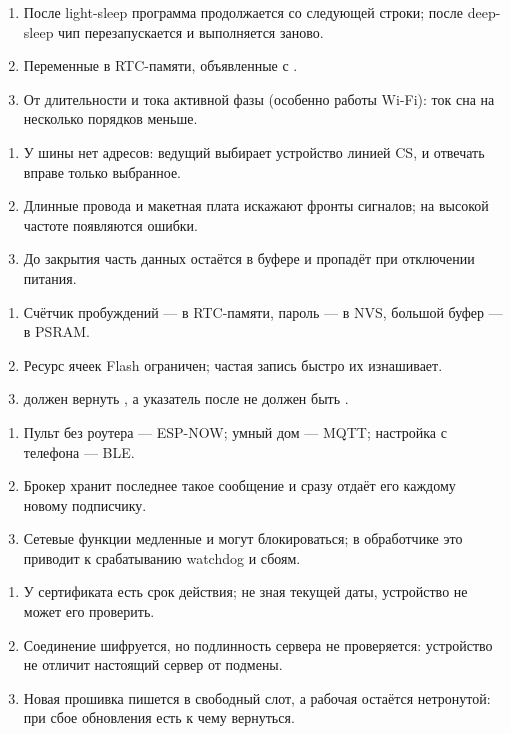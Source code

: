 \begin{enumerate}
  \item После light-sleep программа продолжается со следующей строки; после deep-sleep чип перезапускается и  выполняется заново.
  \item Переменные в RTC-памяти, объявленные с .
  \item От длительности и тока активной фазы (особенно работы Wi-Fi): ток сна на несколько порядков меньше.
\end{enumerate}

\begin{enumerate}
  \item У шины нет адресов: ведущий выбирает устройство линией CS, и отвечать вправе только выбранное.
  \item Длинные провода и макетная плата искажают фронты сигналов; на высокой частоте появляются ошибки.
  \item До закрытия часть данных остаётся в буфере и пропадёт при отключении питания.
\end{enumerate}

\begin{enumerate}
  \item Счётчик пробуждений --- в RTC-памяти, пароль --- в NVS, большой буфер --- в PSRAM.
  \item Ресурс ячеек Flash ограничен; частая запись быстро их изнашивает.
  \item {} должен вернуть , а указатель после  не должен быть .
\end{enumerate}

\begin{enumerate}
  \item Пульт без роутера --- ESP-NOW; умный дом --- MQTT; настройка с телефона --- BLE.
  \item Брокер хранит последнее такое сообщение и сразу отдаёт его каждому новому подписчику.
  \item Сетевые функции медленные и могут блокироваться; в обработчике это приводит к срабатыванию watchdog и сбоям.
\end{enumerate}

\begin{enumerate}
  \item У сертификата есть срок действия; не зная текущей даты, устройство не может его проверить.
  \item Соединение шифруется, но подлинность сервера не проверяется: устройство не отличит настоящий сервер от подмены.
  \item Новая прошивка пишется в свободный слот, а рабочая остаётся нетронутой: при сбое обновления есть к чему вернуться.
\end{enumerate}

